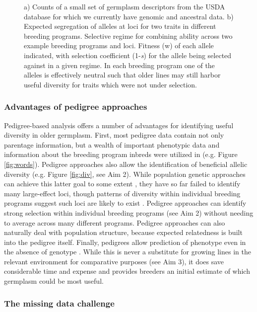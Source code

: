 \documentclass[12pt]{article}
\begin{document}
\begin{figure}[t]
\caption{a) Counts of a small set of germplasm descriptors from the USDA database for which we currently have genomic and ancestral data. b) Expected segregation of alleles at loci for two traits in different breeding programs.  Selective regime for combining ability across two example breeding programs and loci. Fitness (w) of each allele indicated, with selection coefficient (1-\textit{s}) for the allele being selected against in a given regime. In each breeding program one of the alleles is effectively neutral such that older lines may still harbor useful diversity for traits which were not under selection.}

\end{figure}
 
\subsubsection*{Advantages of pedigree approaches}

Pedigree-based analysis offers a number of advantages for identifying useful diversity in older germplasm.
First, most pedigree data contain not only parentage information, but a wealth of important phenotypic data and information about the breeding program inbreds were utilized in (e.g. Figure \ref{fig:words}). 
Pedigree approaches also allow the identification of beneficial allelic diversity (e.g. Figure \ref{fig:div}, see Aim 2).
While population genetic approaches can achieve this latter goal to some extent \citep[e.g.][]{van2012historical}, they have so far failed to identify many large-effect loci, though patterns of diversity within individual breeding programs suggest such loci are likely to exist \citep{Gerke:2013tw}.
Pedigree approaches can identify strong selection within individual breeding programs (see Aim 2) without needing to average across many different programs.  
Pedigree approaches can also naturally deal with population structure, because expected relatedness is built into the pedigree itself.
Finally, pedigrees allow prediction of phenotype even in the absence of genotype \citep{piepho2008blup}.  
While this is never a substitute for growing lines in the relevant environment for comparative purposes (see Aim 3), it does save considerable time and expense and provides breeders an initial estimate of which germplasm could be most useful.

\subsubsection*{The missing data challenge}
\end{document}
